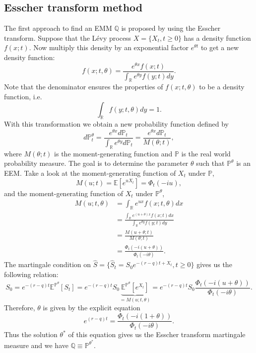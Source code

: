 \subsection{Esscher transform method}
The first approach to find an EMM $\mathbb{Q}$ is proposed by \citeauthor{G+94} \citeyearpar{G+94} \cite{G+94} using the Esscher transform. Suppose that the L\'evy process $X=\{X_t,t\geq0\}$ has a density function $f(x;t)$. Now multiply this density by an exponential factor $e^{\theta t}$ to get a new density function:
$$f(x;t,\theta) = \frac{e^{\theta x}f(x;t)}{\int_{\mathbb{R}}e^{\theta y}f(y;t)dy}.$$
Note that the denominator ensures the properties of $f(x;t,\theta)$ to be a density function, i.e.
$$\int_\mathbb{R}f(y;t,\theta)dy = 1.$$
With this transformation we obtain a new probability function defined by
$$d\mathbb{P}^{\theta}_t = \frac{e^{\theta x}d\mathbb{P}_t}{\int_\mathbb{R}e^{\theta y} d\mathbb{P}_t} = \frac{e^{\theta x}d\mathbb{P}_t}{M(\theta;t)},$$
where $M(\theta;t)$ is the moment-generating function and $\mathbb{P}$ is the real world probability measure. The goal is to determine the parameter $\theta$ such that $\mathbb{P}^{\theta}$ is an EEM.
Take a look at the moment-generating function of $X_t$ under $\mathbb{P}$,
$$M(u;t) = \mathbb{E}\left[e^{u X_t}\right]=\Phi_t(-iu),$$
and the moment-generating function of $X_t$ under $\mathbb{P}^{\theta}$,
\begin{align}\label{eq:CF_theta}
M(u;t,\theta) &= \int_\mathbb{R} e^{u x}f(x;t,\theta)dx\nonumber\\
&=\frac{\int_\mathbb{R} e^{(u+\theta)x}f(x;t) dx}{\int_\mathbb{R} e^{\theta y}f(y;t)dy}\nonumber\\
&= \frac{M(u+\theta;t)}{M(\theta;t)}\nonumber\\
&=\frac{\Phi_t(-i(u+\theta))}{\Phi_t(-i\theta)}.
\end{align}
The martingale condition on $\hat{S}=\{\hat{S}_t=S_0e^{-(r-q)t+X_t},t\geq0\}$ gives us the following relation:
$$S_0 = e^{-(r-q)t}\mathbb{E}^{\mathbb{P}^\theta}\left[S_t\right]=e^{-(r-q)t}S_0\underbrace{\mathbb{E}^{\mathbb{P}^\theta}\left[e^{X_t}\right]}_{=M(u;t,\theta)}=e^{-(r-q)t}S_0 \frac{\Phi_t(-i(u+\theta))}{\Phi_t(-i\theta)}.$$
Therefore, $\theta$ is given by the explicit equation
$$ e^{(r-q)t}= \frac{\Phi_t(-i(1+\theta))}{\Phi_t(-i\theta)}.$$
Thus the solution $\theta^\ast$ of this equation gives us the Esscher transform martingale measure and we have $\mathbb{Q} \equiv \mathbb{P}^{\theta^\ast}$.

